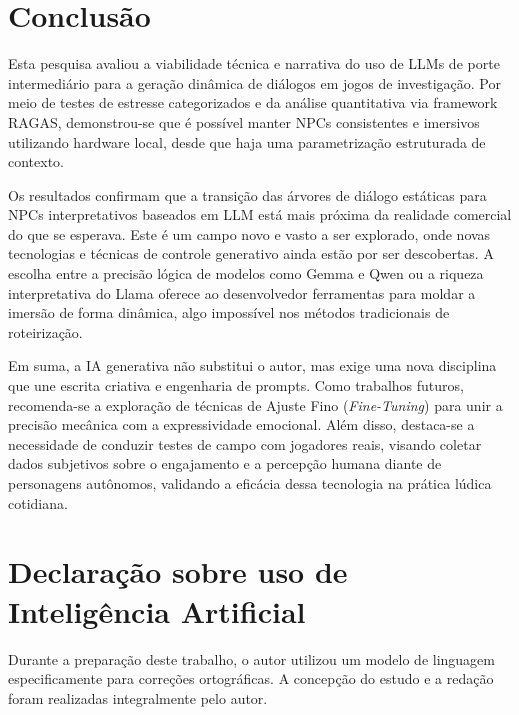 \documentclass[12pt]{article}
\begin{document}
\section{Conclusão}

Esta pesquisa avaliou a viabilidade técnica e narrativa do uso de LLMs de porte intermediário para a geração dinâmica de diálogos em jogos de investigação. Por meio de testes de estresse categorizados e da análise quantitativa via framework RAGAS, demonstrou-se que é possível manter NPCs consistentes e imersivos utilizando hardware local, desde que haja uma parametrização estruturada de contexto.

Os resultados confirmam que a transição das árvores de diálogo estáticas para NPCs interpretativos baseados em LLM está mais próxima da realidade comercial do que se esperava. Este é um campo novo e vasto a ser explorado, onde novas tecnologias e técnicas de controle generativo ainda estão por ser descobertas. A escolha entre a precisão lógica de modelos como Gemma e Qwen ou a riqueza interpretativa do Llama oferece ao desenvolvedor ferramentas para moldar a imersão de forma dinâmica, algo impossível nos métodos tradicionais de roteirização.

Em suma, a IA generativa não substitui o autor, mas exige uma nova disciplina que une escrita criativa e engenharia de prompts. Como trabalhos futuros, recomenda-se a exploração de técnicas de Ajuste Fino (\textit{Fine-Tuning}) para unir a precisão mecânica com a expressividade emocional. Além disso, destaca-se a necessidade de conduzir testes de campo com jogadores reais, visando coletar dados subjetivos sobre o engajamento e a percepção humana diante de personagens autônomos, validando a eficácia dessa tecnologia na prática lúdica cotidiana.

\section*{Declaração sobre uso de Inteligência Artificial}

Durante a preparação deste trabalho, o autor utilizou um modelo de linguagem especificamente para correções ortográficas. A concepção do estudo e a redação foram realizadas integralmente pelo autor.



\end{document}
